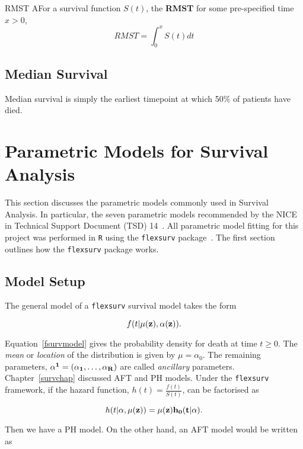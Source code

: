 \begin{definition}{RMST}
    AFor a survival function $S(t)$, the \textbf{RMST} for some pre-specified time $x > 0$,
    \[
        RMST = \int_{0}^{x} S(t)dt
    \] 
    \label{def:rmst}
\end{definition}

\subsection{Median Survival}
Median survival is simply the earliest timepoint at which 50\% of patients have died. 

\section{Parametric Models for Survival Analysis}
This section discusses the parametric models commonly used in Survival Analysis. In particular, the seven parametric models recommended by the NICE in Technical Support Document (TSD) 14~\cite{tsd14}. All parametric model fitting for this project was performed in \verb|R| using the \verb|flexsurv| package~\cite{flexsurv}. The first section outlines how the \verb|flexsurv| package works.

\subsection{Model Setup}
The general model of a \verb|flexsurv| survival model takes the form 

\begin{equation}
    \label{fsurvmodel}
    f(t|\mu(\bf{z}), \bf{\alpha}(\bf{z})).
\end{equation}

Equation~\ref{fsurvmodel} gives the probability density for death at time $t \geq 0$. The \textit{mean} or \textit{location} of the distribution is given by $\mu = \alpha_0$. The remaining parameters, $\bf{\alpha^1} = (\alpha_1, \ldots, \alpha_R)$ are called \textit{ancillary} parameters. \\

Chapter~\ref{survchap} discussed AFT and PH models. Under the \verb|flexsurv| framework, if the hazard function, $h(t) = \frac{f(t)}{S(t)}$, can be factorised as 

\[
    h(t|\bf{\alpha}, \mu(\bf{z})) = \mu(\bf{z})h_0(t|\bf{\alpha}). 
\] 

Then we have a PH model. On the other hand, an AFT model would be written as

